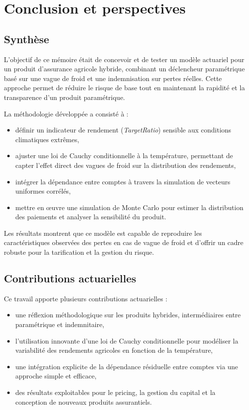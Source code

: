 \documentclass[11pt,a4paper,openright,twoside]{report}
\begin{document}
\chapter*{Conclusion et perspectives}

\section*{Synthèse}
L’objectif de ce mémoire était de concevoir et de tester un modèle actuariel pour un produit d’assurance agricole hybride, combinant un déclencheur paramétrique basé sur une vague de froid et une indemnisation sur pertes réelles.  
Cette approche permet de réduire le risque de base tout en maintenant la rapidité et la transparence d’un produit paramétrique.  

La méthodologie développée a consisté à :
\begin{itemize}
    \item définir un indicateur de rendement (\textit{TargetRatio}) sensible aux conditions climatiques extrêmes,
    \item ajuster une loi de Cauchy conditionnelle à la température, permettant de capter l’effet direct des vagues de froid sur la distribution des rendements,
    \item intégrer la dépendance entre comptes à travers la simulation de vecteurs uniformes corrélés,
    \item mettre en œuvre une simulation de Monte Carlo pour estimer la distribution des paiements et analyser la sensibilité du produit.
\end{itemize}

Les résultats montrent que ce modèle est capable de reproduire les caractéristiques observées des pertes en cas de vague de froid et d’offrir un cadre robuste pour la tarification et la gestion du risque.

\section*{Contributions actuarielles}
Ce travail apporte plusieurs contributions actuarielles :
\begin{itemize}
    \item une réflexion méthodologique sur les produits hybrides, intermédiaires entre paramétrique et indemnitaire,
    \item l’utilisation innovante d’une loi de Cauchy conditionnelle pour modéliser la variabilité des rendements agricoles en fonction de la température,
    \item une intégration explicite de la dépendance résiduelle entre comptes via une approche simple et efficace,
    \item des résultats exploitables pour le pricing, la gestion du capital et la conception de nouveaux produits assurantiels.
\end{itemize}
\end{document}
